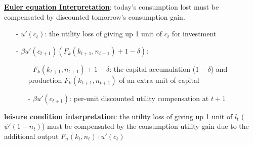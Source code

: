 \documentclass[10pt,landscape,a4paper]{article}
\begin{document}
\begin{multicols*}{3}
\vspace{4pt}
\underline{\textbf{{\color{myred}Euler equation} Interpretation}}: today's consumption lost must be compensated by discounted tomorrow's consumption gain.
\begin{itemize}
    \item[-] $u'(c_t)$: the utility loss of giving up 1 unit of $c_t$ for investment
    \item[-] $\beta u'(c_{t+1})(F_k(k_{t+1},n_{t+1})+1-\delta)$:
    \begin{itemize}
        \item[-] $F_k(k_{t+1},n_{t+1})+1-\delta$: the capital accumulation ($1-\delta$) and production $F_k(k_{t+1},n_{t+1})$ of an extra unit of capital
        \item[-] $\beta u'(c_{t+1})$: per-unit discounted utility compensation at $t+1$
    \end{itemize}
\end{itemize}
\underline{\textbf{{\color{myred}leisure condition} interpretation}}: the utility loss of giving up 1 unit of $l_t$ ($\psi'(1-n_t)$) must be compensated by the consumption utility gain due to the additional output $F_n(k_t,n_t)\cdot u'(c_t)$


\vspace{2pt}
\end{multicols*}
\end{document}
